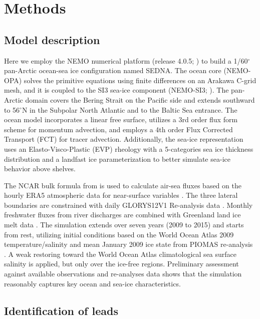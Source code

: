 \section{Methods}
\subsection*{Model description}

Here we employ the NEMO numerical platform (release 4.0.5; \citealp{NEMO_man}) to build a 1/60$^\circ$ pan-Arctic ocean-sea ice configuration named SEDNA. The ocean core (NEMO-OPA) solves the primitive equations using finite differences on an Arakawa C-grid mesh, and it is coupled to the SI3 sea-ice component (NEMO-SI3; \citealp{SI3_man}). The pan-Arctic domain covers the Bering Strait on the Pacific side and extends southward to 56$^\circ$N in the Subpolar North Atlantic and to the Baltic Sea entrance. The ocean model incorporates a linear free surface, utilizes a 3rd order flux form scheme for momentum advection, and employs a 4th order Flux Corrected Transport (FCT) for tracer advection. Additionally, the sea-ice representation uses an Elasto-Visco-Plastic (EVP) rheology with a 5-categories sea ice thickness distribution and a landfast ice parameterization to better simulate sea-ice behavior above shelves.

The NCAR bulk formula from \citet{Large_global_2009} is used to calculate air-sea fluxes based on the hourly ERA5 atmospheric data for near-surface variables \citep{Hersbach_ERA5_2020}. The three lateral boundaries are constrained with daily GLORYS12V1 Re-analysis data \citep{GLORYS12}. Monthly freshwater fluxes from river discharges are combined with Greenland land ice melt data \citep{HuEA_rivers_2019}. The simulation extends over seven years (2009 to 2015) and starts from rest, utilizing initial conditions based on the World Ocean Atlas 2009 temperature/salinity and mean January 2009 ice state from PIOMAS re-analysis \citep{Locarnini_data_2010, PIOMAS}. A weak restoring toward the World Ocean Atlas climatological sea surface salinity is applied, but only over the ice-free regions. Preliminary assessment against available observations and re-analyses data shows that the simulation reasonably captures key ocean and sea-ice characteristics.

\subsection*{Identification of leads}

